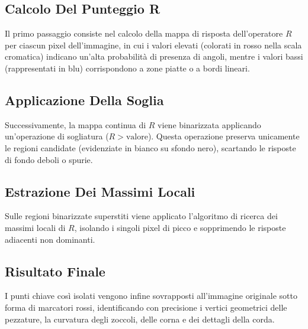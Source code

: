 ﻿\documentclass[11pt, a4paper]{article}
\begin{document}
\subsection{Calcolo Del Punteggio R}
Il primo passaggio consiste nel calcolo della mappa di risposta dell'operatore $R$ per ciascun pixel dell'immagine, in cui i valori elevati (colorati in rosso nella scala cromatica) indicano un'alta probabilità di presenza di angoli, mentre i valori bassi (rappresentati in blu) corrispondono a zone piatte o a bordi lineari.


\subsection{Applicazione Della Soglia}
Successivamente, la mappa continua di $R$ viene binarizzata applicando un'operazione di sogliatura ($R > \text{valore}$). Questa operazione preserva unicamente le regioni candidate (evidenziate in bianco su sfondo nero), scartando le risposte di fondo deboli o spurie.


\subsection{Estrazione Dei Massimi Locali}
Sulle regioni binarizzate superstiti viene applicato l'algoritmo di ricerca dei massimi locali di $R$, isolando i singoli pixel di picco e sopprimendo le risposte adiacenti non dominanti.


\subsection{Risultato Finale}
I punti chiave così isolati vengono infine sovrapposti all'immagine originale sotto forma di marcatori rossi, identificando con precisione i vertici geometrici delle pezzature, la curvatura degli zoccoli, delle corna e dei dettagli della corda.

\end{document}
